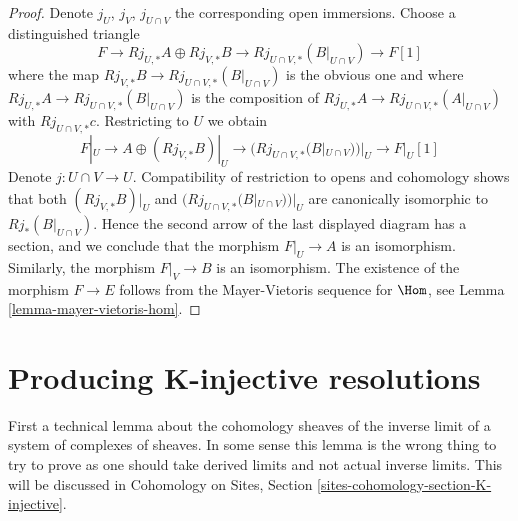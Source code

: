 \begin{proof}
Denote $j_U$, $j_V$, $j_{U \cap V}$ the corresponding open immersions.
Choose a distinguished triangle
$$
F \to Rj_{U, *}A \oplus Rj_{V, *}B \to Rj_{U \cap V, *}(B|_{U \cap V})
\to F[1]
$$
where the map $Rj_{V, *}B \to Rj_{U \cap V, *}(B|_{U \cap V})$ is the
obvious one and where
$Rj_{U, *}A \to Rj_{U \cap V, *}(B|_{U \cap V})$
is the composition of
$Rj_{U, *}A \to Rj_{U \cap V, *}(A|_{U \cap V})$
with $Rj_{U \cap V, *}c$. Restricting to $U$ we obtain
$$
F|_U \to A \oplus (Rj_{V, *}B)|_U \to (Rj_{U \cap V, *}(B|_{U \cap V}))|_U
\to F|_U[1]
$$
Denote $j : U \cap V \to U$. Compatibility of restriction to opens and
cohomology shows that both
$(Rj_{V, *}B)|_U$ and $(Rj_{U \cap V, *}(B|_{U \cap V}))|_U$
are canonically isomorphic to $Rj_*(B|_{U \cap V})$.
Hence the second arrow of the last displayed diagram has
a section, and we conclude that the morphism $F|_U \to A$ is
an isomorphism. Similarly, the morphism $F|_V \to B$ is an
isomorphism. The existence of the morphism $F \to E$ follows
from the Mayer-Vietoris sequence for $\Hom$, see
Lemma \ref{lemma-mayer-vietoris-hom}.
\end{proof}








\section{Producing K-injective resolutions}
\label{section-K-injective}

\noindent
First a technical lemma about the cohomology sheaves of the inverse
limit of a system of complexes of sheaves. In some sense this lemma
is the wrong thing to try to prove as one should take derived
limits and not actual inverse limits. This will be discussed in
Cohomology on Sites, Section \ref{sites-cohomology-section-K-injective}.

